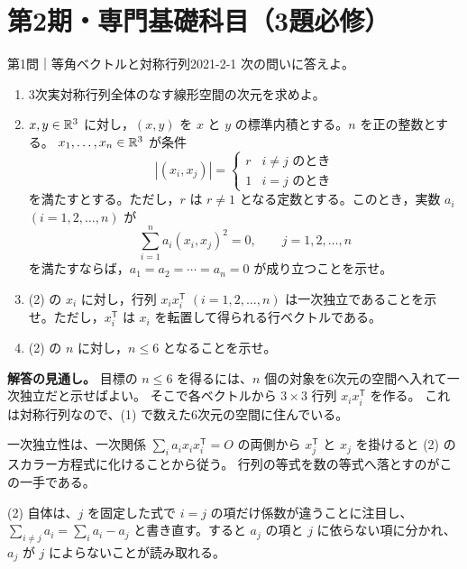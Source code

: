 \section{第2期・専門基礎科目（3題必修）}

\begin{problem}{第1問｜等角ベクトルと対称行列}{2021-2-1}
次の問いに答えよ。
\begin{enumerate}
  \item[(1)] 3次実対称行列全体のなす線形空間の次元を求めよ。
  \item[(2)] $x,y\in\mathbb{R}^3$ に対し，$(x,y)$ を $x$ と $y$ の標準内積とする。$n$ を正の整数とする。
  $x_1,\ldots,x_n\in\mathbb{R}^3$ が条件
  \[
  |(x_i,x_j)|=\begin{cases}r&i\ne j\text{ のとき}\\1&i=j\text{ のとき}\end{cases}
  \]
  を満たすとする。ただし，$r$ は $r\ne1$ となる定数とする。このとき，実数 $a_i$ $(i=1,2,\ldots,n)$ が
  \[
  \sum_{i=1}^na_i(x_i,x_j)^2=0,\qquad j=1,2,\ldots,n
  \]
  を満たすならば，$a_1=a_2=\cdots=a_n=0$ が成り立つことを示せ。
  \item[(3)] (2) の $x_i$ に対し，行列 $x_ix_i^{\mathsf T}$ $(i=1,2,\ldots,n)$ は一次独立であることを示せ。ただし，$x_i^{\mathsf T}$ は $x_i$ を転置して得られる行ベクトルである。
  \item[(4)] (2) の $n$ に対し，$n\le6$ となることを示せ。
\end{enumerate}
\end{problem}
\begin{memo*}
\textbf{解答の見通し。}
目標の $n\le6$ を得るには、$n$ 個の対象を6次元の空間へ入れて一次独立だと示せばよい。
そこで各ベクトルから $3\times3$ 行列 $x_ix_i^{\mathsf T}$ を作る。
これは対称行列なので、(1) で数えた6次元の空間に住んでいる。

一次独立性は、一次関係 $\sum_ia_ix_ix_i^{\mathsf T}=O$ の両側から
$x_j^{\mathsf T}$ と $x_j$ を掛けると (2) のスカラー方程式に化けることから従う。
行列の等式を数の等式へ落とすのがこの一手である。

(2) 自体は、$j$ を固定した式で $i=j$ の項だけ係数が違うことに注目し、
$\sum_{i\ne j}a_i=\sum_ia_i-a_j$ と書き直す。すると $a_j$ の項と $j$ に依らない項に分かれ、
$a_j$ が $j$ によらないことが読み取れる。
\end{memo*}
